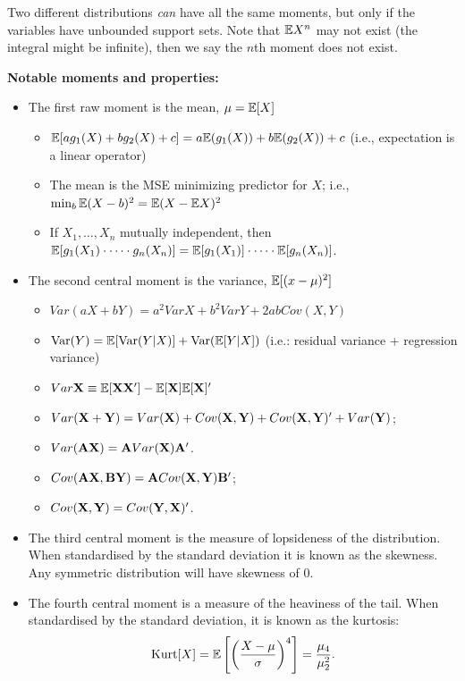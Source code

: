 \documentclass[DIV=14,titlepage=false]{scrreprt}
\begin{document}
Two different distributions \textit{can} have all the same moments, but only if the variables have unbounded support sets. Note that $\mathbb{E} X^n$ may not exist (the integral might be infinite), then we say the $n$th moment does not exist.

\textbf{Notable moments and properties:}
\begin{itemize}
  \item The first raw moment is the mean, $\mu = \mathbb{E} [X]$
  \begin{itemize}
    \item $ \mathbb{E} [a g_1(X) + b g_2(X) + c] = a \mathbb{E}(g_1(X)) + b \mathbb{E}(g_2(X)) + c $ (i.e., expectation is a linear operator)
    \item The mean is the MSE minimizing predictor for $ X $; i.e., $ \min_b \mathbb{E} (X - b)^2 = \mathbb{E} (X - \mathbb{E} X)^2 $
    \item If $ X_1, \dotsc , X_n $ mutually independent, then $ \mathbb{E} [ g_1(X_1) \cdot \dotsb \cdot g_n(X_n) ] = \mathbb{E} [ g_1(X_1)] \cdot \dotsb \cdot \mathbb{E} [g_n(X_n) ] $.
  \end{itemize}
  \item The second central moment is the variance, $\mathbb{E} [(x-\mu)^2]$
  \begin{itemize}
    \item $Var(aX + bY) = a^2 VarX + b^2 VarY + 2ab Cov(X,Y) $
    \item $\text{Var}(Y) = \mathbb{E} [\text{Var}(Y|X)] + \text{Var}(\mathbb{E} [Y|X])$ (i.e.: residual variance + regression variance)
    \item $ Var \mathbf{X} \equiv \mathbb{E} [ \mathbf{X} \mathbf{X}' ] - \mathbb{E} [ \mathbf{X} ] \mathbb{E} [ \mathbf{X} ]' $
    \item $ Var ( \mathbf{X} + \mathbf{Y} ) = Var ( \mathbf{X} ) + Cov ( \mathbf{X} , \mathbf{Y} ) + Cov ( \mathbf{X} , \mathbf{Y} )' + Var ( \mathbf{Y} ) $;
    \item $ Var (\mathbf{A} \mathbf{X}) = \mathbf{A} Var ( \mathbf{X} ) \mathbf{A}' $.
    \item $ Cov (\mathbf{A} \mathbf{X}, \mathbf{B} \mathbf{Y}) = \mathbf{A} Cov (\mathbf{X}, \mathbf{Y}) \mathbf{B}' $;
    \item $ Cov (\mathbf{X}, \mathbf{Y}) = Cov ( \mathbf{Y} , \mathbf{X} )' $.
  
  \end{itemize}
  \item The third central moment is the measure of lopsideness of the distribution. When standardised by the standard deviation it is known as the skewness. Any symmetric distribution will have skewness of 0.
  \item The fourth central moment is a measure of the heaviness of the tail. When standardised by the standard deviation, it is known as the kurtosis:
  \[
  \text{Kurt}[X] = \mathbb{E}\left[ \left( \frac{X - \mu}{\sigma} \right)^4 \right]= \frac{\mu_4}{\mu^2_2}.
  \]
\end{itemize}
\end{document}
